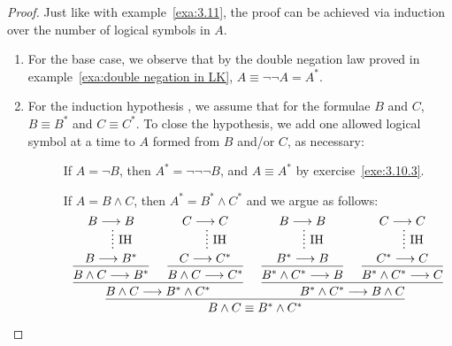 \documentclass[11pt,a4paper]{article}
\begin{document}
\begin{proof}
    Just like with example~\ref{exa:3.11}, the proof can be achieved via induction over the number of logical symbols in \(A\).
    \begin{enumerate}
        \item
            For the base case, we observe that by the double negation law proved in example~\ref{exa:double negation in LK},
            \(A\equiv\lnot\lnot A = A^\ast\).
        \item
            For the induction hypothesis \IH, we assume that for the formulae \(B\) and \(C\),
            \(B\equiv B^\ast\) and \(C\equiv C^\ast\). To close the hypothesis,
            we add one allowed logical symbol at a time to \(A\) formed from \(B\) and/or \(C\),
            as necessary:
            \begin{description}
                \item[\lnot]
                    If \(A = \lnot B\), then \(A^\ast = \lnot\lnot\lnot B\),
                    and \(A\equiv A^\ast\) by exercise~\ref{exe:3.10.3}.
                \item[\land]
                    If \(A = B\land C\), then \(A^\ast = B^\ast\land C^\ast\) and we argue as follows:
                    \begin{equation*}
                        \begin{prooftree}
                            \hypo{B\seq B}
                            \ellipsis{\IH}{B\seq B^\ast}
                            \infer1{B\land C\seq B^\ast}
                            \hypo{C\seq C}
                            \ellipsis{\IH}{C\seq C^\ast}
                            \infer1{B\land C\seq C^\ast}
                            \infer2{B\land C \seq B^\ast\land C^\ast}
                            \hypo{B\seq B}
                            \ellipsis{\IH}{B^\ast\seq B}
                            \infer1{B^\ast\land C^\ast\seq B}
                            \hypo{C\seq C}
                            \ellipsis{\IH}{C^\ast\seq C}
                            \infer1{B^\ast\land C^\ast\seq C}
                            \infer2{B^\ast\land C^\ast \seq B\land C}
                            \infer2{B\land C \equiv B^\ast\land C^\ast}
                        \end{prooftree}
                    \end{equation*}
                \item[\lor]
                    \begin{exercise}\label{exe:3.12.1.iii}

\end{exercise}
\end{description}
\end{enumerate}
\end{proof}
\end{document}
